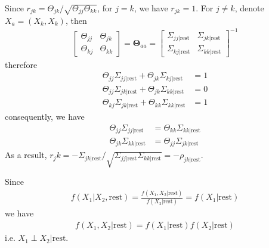 \begin{exercise}
  \begin{exerciseSection}
    Since $r_{jk} = \Theta_{jk} / \sqrt{\Theta_{jj} \Theta_{kk}}$, for $j=k$, we
    have $r_{jk} = 1$. For $j\not=k$, denote $X_a = (X_k, X_k)$, then
    \begin{align}
      \left[
        \begin{array}{cc}
          \Theta_{jj} & \Theta_{jk} \\ 
          \Theta_{kj} & \Theta_{kk}
        \end{array}
      \right] = \mathbf{\Theta}_{aa} =
      \left[
        \begin{array}{cc}
          \Sigma_{jj|\mbox{rest}} & \Sigma_{jk|\mbox{rest}} \\ 
          \Sigma_{kj|\mbox{rest}} & \Sigma_{kk|\mbox{rest}}
        \end{array}
      \right]^{-1}
    \end{align}
    therefore
    \begin{subequations}
      \begin{align}
        \Theta_{jj} \Sigma_{jj|\mbox{rest}} + \Theta_{jk}
        \Sigma_{kj|\mbox{rest}} &= 1 \\
        \Theta_{jj} \Sigma_{jk|\mbox{rest}} + \Theta_{jk}
        \Sigma_{kk|\mbox{rest}} &= 0 \\
        \Theta_{kj} \Sigma_{jk|\mbox{rest}} + \Theta_{kk}
        \Sigma_{kk|\mbox{rest}} & = 1
      \end{align}
    \end{subequations}
    consequently, we have
    \begin{subequations}
      \begin{align}
        \Theta_{jj} \Sigma_{jj|\mbox{rest}} & = \Theta_{kk}
        \Sigma_{kk|\mbox{rest}} \\
        \Theta_{jk} \Sigma_{kk|\mbox{rest}} & = \Theta_{jj}
        \Sigma_{jk|\mbox{rest}}
      \end{align}
    \end{subequations}
    As a result, $r_jk = -\Sigma_{jk|\mbox{rest}} /
    \sqrt{\Sigma_{jj|\mbox{rest}} \Sigma_{kk|\mbox{rest}}} =
    -\rho_{jk|\mbox{rest}}$.
  \end{exerciseSection}
\end{exercise}

\begin{exercise}
  Since
  \begin{align}
    f(X_1|X_2, \mbox{rest}) = \frac{f(X_1, X_2| \mbox{rest})}{f(X_2|
    \mbox{rest})} = f(X_1|\mbox{rest})
  \end{align}
  we have
  \begin{align}
    f(X_1, X_2| \mbox{rest}) = f(X_1|\mbox{rest}) f(X_2|\mbox{rest})
  \end{align}
  i.e. $X_1\perp X_2|\mbox{rest}$.
\end{exercise}

